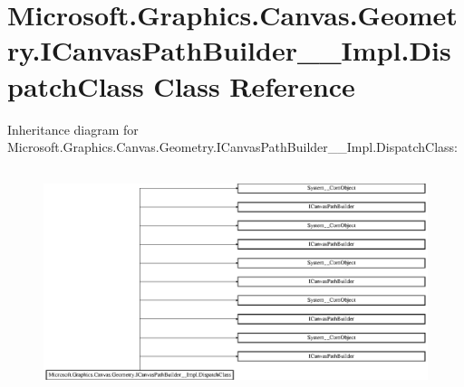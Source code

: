 \hypertarget{class_microsoft_1_1_graphics_1_1_canvas_1_1_geometry_1_1_i_canvas_path_builder_____impl_1_1_dispatch_class}{}\section{Microsoft.\+Graphics.\+Canvas.\+Geometry.\+I\+Canvas\+Path\+Builder\+\_\+\+\_\+\+Impl.\+Dispatch\+Class Class Reference}
\label{class_microsoft_1_1_graphics_1_1_canvas_1_1_geometry_1_1_i_canvas_path_builder_____impl_1_1_dispatch_class}
Inheritance diagram for Microsoft.\+Graphics.\+Canvas.\+Geometry.\+I\+Canvas\+Path\+Builder\+\_\+\+\_\+\+Impl.\+Dispatch\+Class\+:\begin{figure}[H]
\begin{center}
\leavevmode
\includegraphics[height=6.581197cm]{class_microsoft_1_1_graphics_1_1_canvas_1_1_geometry_1_1_i_canvas_path_builder_____impl_1_1_dispatch_class}
\end{center}
\end{figure}
